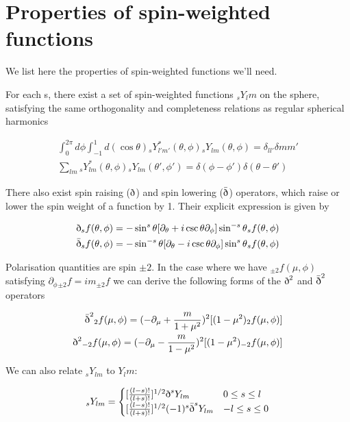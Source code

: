 \documentclass[a4paper,11pt]{article}
\newcommand{\sr}{\text{\normalfont\dh}}
\renewcommand{\sl}{\bar{\text{\normalfont\dh}}}
\begin{document}
\appendix

\section{Properties of spin-weighted functions}
We list here the properties of spin-weighted functions we'll need. 

For each s, there exist a set of spin-weighted functions $_sY_lm$ on the sphere, satisfying the same orthogonality and completeness relations as regular spherical harmonics

\begin{align}
\int_0^{2\pi} d\phi \int_{-1}^{1} d(\cos{\theta}) {}_sY_{l'm'}^*(\theta,\phi){}_sY_{lm}(\theta,\phi) = \delta_{ll'}\delta{mm'} \\
\sum_{lm} {}_sY_{lm}^*(\theta,\phi){}_sY_{lm}(\theta',\phi')=\delta(\phi-\phi')\delta(\theta-\theta')
\end{align}

There also exist spin raising ($\sr$) and spin lowering ($\sl$) operators, which raise or lower the spin weight of a function by 1. Their explicit expression is given by

\begin{align}
\sr {}_sf(\theta, \phi) &= -\sin^s{\theta}[\partial_\theta+i\csc{\theta}\partial_\phi]\sin^{-s}{\theta}{}_sf(\theta, \phi)\\
\sl {}_sf(\theta, \phi) &= -\sin^{-s}{\theta}[\partial_\theta-i\csc{\theta}\partial_\phi]\sin^{s}{\theta}{}_sf(\theta, \phi)
\end{align}

Polarisation quantities are spin $\pm 2$. In the case where we have ${}_{\pm2}f(\mu,\phi)$ satisfying $\partial_\phi{}_{\pm2}f=im_{\pm2}f$ we can derive the following forms of the $\sr^2$ and $\sl^2$ operators

\begin{align}
\sl^2{}_2f(\mu, \phi) = (-\partial_\mu+\frac{m}{1+\mu^2})^2[(1-\mu^2)_2f(\mu,\phi)]\\
\sr^2{}_{-2}f(\mu, \phi) = (-\partial_\mu-\frac{m}{1-\mu^2})^2[(1-\mu^2)_{-2}f(\mu,\phi)]
\label{+-2}
\end{align}


We can also relate $_sY_{lm}$ to $Y_lm$:

\begin{equation}
_sY_{lm} = 
\begin{cases}
[\frac{(l-s)!}{(l+s)!}]^{1/2}\sr^s Y_{lm} & 0\leq s\leq l\\
[\frac{(l-s)!}{(l+s)!}]^{1/2}(-1)^s\sl^s Y_{lm} & -l\leq s\leq 0
\end{cases}
\end{equation}
\end{document}
